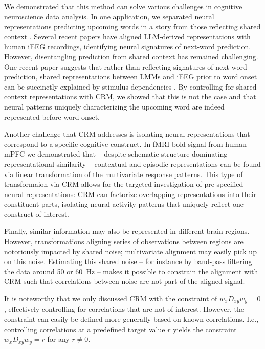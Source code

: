 \documentclass{article}
\begin{document}
We demonstrated that this method can solve various challenges in cognitive neuroscience data analysis. In one application, we separated neural representations predicting upcoming words in a story from those reflecting shared context \cite{goldsteinAlignmentBrainEmbeddings2024, goldsteinSharedComputationalPrinciples2022, schonmannStimulusDependenciesRather2025}. Several recent papers have aligned LLM-derived representations with human iEEG recordings, identifying neural signatures of next-word prediction. However, disentangling prediction from shared context has remained challenging. One recent paper suggests that rather than reflecting signatures of next-word prediction, shared representations between LMMs and iEEG prior to word onset can be succinctly explained by stimulus-dependencies \cite{schonmannStimulusDependenciesRather2025}. By controlling for shared context representations with CRM, we showed that this is not the case and that neural patterns uniquely characterizing the upcoming word are indeed represented before word onset.

Another challenge that CRM addresses is isolating neural representations that correspond to a specific cognitive construct. In fMRI bold signal from human mPFC \cite{reaghFlexibleReuseCorticohippocampal2023a} we demonstrated that -- despite schematic structure dominating representational similarity -- contextual and episodic representations can be found via linear transformation of the multivariate response patterns. This type of transformaion via CRM allows for the targeted investigation of pre-specified neural representations: CRM can factorize overlapping representations into their constituent parts, isolating neural activity patterns that uniquely reflect one construct of interest.

Finally, similar information may also be represented in different brain regions. However, transformations aligning series of observations between regions are notoriously impacted by shared noise; multivariate alignment may easily pick up on this noise. Estimating this shared noise -- for instance by band-pass filtering the data around 50 or 60~Hz -- makes it possible to constrain the alignment with CRM such that correlations between noise are not part of the aligned signal.

It is noteworthy that we only discussed CRM with the constraint of $w_x D_{xy} w_y = 0$, effectively controlling for correlations that are not of interest. However, the constraint can easily be defined more generally based on known correlations. I.e., controlling correlations at a predefined target value $r$ yields the constraint $w_x D_{xy} w_y = r$ for any $r\neq0$.
\end{document}
